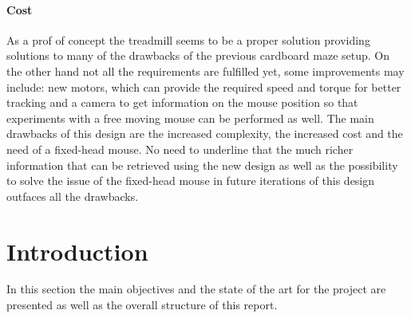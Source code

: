 \documentclass[12pt,a4paper]{article}
\begin{document}
\begin{multicols}{2}
\paragraph{Cost}
As a prof of concept the treadmill seems to be a proper solution providing solutions to many of the drawbacks of the previous cardboard maze setup. On the other hand not all the requirements are fulfilled yet, some improvements may include: new motors, which can provide the required speed and torque for better tracking and a camera to get information on the mouse position so that experiments with a free moving mouse can be performed as well. The main drawbacks of this design are the increased complexity, the increased cost and the need of a fixed-head mouse. No need to underline that the much richer information that can be retrieved using the new design as well as the possibility to solve the issue of the fixed-head mouse in future iterations of this design outfaces all the drawbacks.  



\end{multicols}

\clearpage
\lfoot{ }
\rfoot{ }
\chead{ }


\pagestyle{plain}
\clearpage

\tableofcontents
\clearpage
\pagestyle{fancy}
\section{Introduction}\label{sec:intro}
In this section the main objectives and the state of the art for the project are presented as well as the overall structure of this report.
\end{document}
